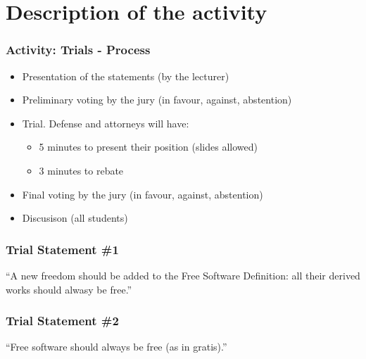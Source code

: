 

\section{Description of the activity}


\begin{frame}
\frametitle{Activity: Trials - Process}

\begin{itemize}
\item Presentation of the statements (by the lecturer)
\item Preliminary voting by the jury (in favour, against, abstention)
\item Trial. Defense and attorneys will have:
\begin{itemize}
  \item 5 minutes to present their position (slides allowed)
  \item 3 minutes to rebate
\end{itemize}
\item Final voting by the jury (in favour, against, abstention)
\item Discusison (all students)
\end{itemize}

\end{frame}


\begin{frame}
\frametitle{Trial Statement \#1}

\begin{center}
\begin{LARGE}
``A new freedom should be added to the Free Software Definition:
all their derived works should alwasy be free.''
\end{LARGE}
\end{center}

\end{frame}



\begin{frame}
\frametitle{Trial Statement \#2}

\begin{center}
\begin{LARGE}
``Free software should always be free (as in gratis).''
\end{LARGE}
\end{center}

\end{frame}



